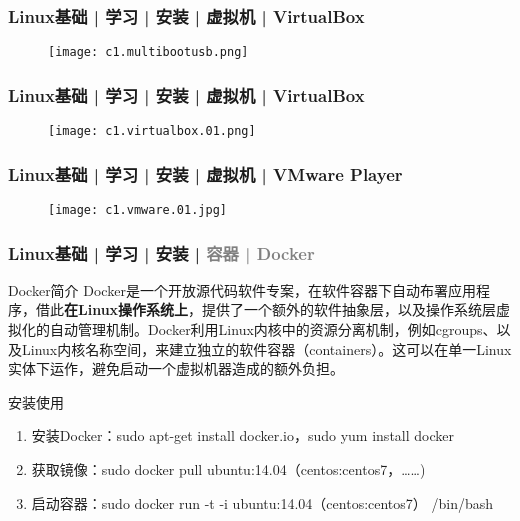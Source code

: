 \begin{frame}
  \frametitle{Linux基础 | 学习 | 安装 | 虚拟机 | VirtualBox}
  \begin{figure}
    \centering
    \texttt{[image: c1.multibootusb.png]}
  \end{figure}
\end{frame}

\begin{frame}
  \frametitle{Linux基础 | 学习 | 安装 | 虚拟机 | VirtualBox}
  \begin{figure}
    \centering
    \texttt{[image: c1.virtualbox.01.png]}
  \end{figure}
\end{frame}

\begin{frame}
  \frametitle{Linux基础 | 学习 | 安装 | 虚拟机 | VMware Player}
  \begin{figure}
    \centering
    \texttt{[image: c1.vmware.01.jpg]}
  \end{figure}
\end{frame}

\begin{frame}
  \frametitle{Linux基础 | 学习 | 安装 | \textcolor{gray}{容器 | Docker}}
  \begin{block}{Docker简介}
    Docker是一个开放源代码软件专案，在软件容器下自动布署应用程序，借此\textbf{在Linux操作系统上}，提供了一个额外的软件抽象层，以及操作系统层虚拟化的自动管理机制。Docker利用Linux内核中的资源分离机制，例如cgroups、以及Linux内核名称空间，来建立独立的软件容器（containers）。这可以在单一Linux实体下运作，避免启动一个虚拟机器造成的额外负担。
  \end{block}
  \pause
  \begin{block}{安装使用}
    \begin{enumerate}
      \item 安装Docker：sudo apt-get install docker.io，sudo yum install docker
      \item 获取镜像：sudo docker pull ubuntu:14.04（centos:centos7，……)
      \item 启动容器：sudo docker run -t -i ubuntu:14.04（centos:centos7） /bin/bash
    \end{enumerate}
  \end{block}
\end{frame}

